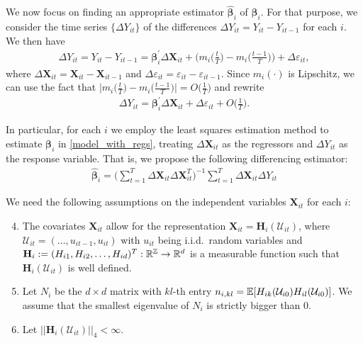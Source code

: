 \documentclass[a4paper,12pt]{article}
\begin{document}
We now focus on finding an appropriate estimator $\widehat{\bm{\beta}}_i$ of $\bm{\beta}_i$. For that purpose, we consider the time series $\{\Delta Y_{it}\}$ of the differences $\Delta Y_{it} = Y_{it} - Y_{i t-1}$ for each $i$. We then have
\begin{align*}
	\Delta Y_{it} = Y_{it} - Y_{i t-1} =\bm{\beta}_i^\prime \Delta \mathbf{X}_{it} + \bigg(m_i \Big( \frac{t}{T} \Big) - m_i \Big(\frac{t-1}{T}\Big)\bigg) + \Delta \varepsilon_{it},
\end{align*}
where $\Delta  \mathbf{X}_{it} =  \mathbf{X}_{it} -  \mathbf{X}_{it-1}$ and $ \Delta \varepsilon_{it} = \varepsilon_{it} - \varepsilon_{i t-1}$. Since $m_i(\cdot)$ is Lipschitz, we can use the fact that $ \big|m_i \big( \frac{t}{T} \big) - m_i \big(\frac{t-1}{T}\big) \big| = O\big(\frac{1}{T}\big)$ and rewrite 
\begin{align}\label{model_with_regs}
	\Delta Y_{it} = \bm{\beta}_i^\prime \Delta \mathbf{X}_{it} + \Delta \varepsilon_{it} + O\Big(\frac{1}{T}\Big).
\end{align}

In particular, for each $i$ we employ the least squares estimation method to estimate $\bm{\beta}_i$ in \eqref{model_with_regs}, treating $\Delta \mathbf{X}_{it}$ as the regressors and $\Delta Y_{it}$ as the response variable. That is, we propose the following differencing estimator:
\begin{align}\label{dif-est}
\widehat{\bm{\beta}}_i = \Big( \sum_{t=1}^T \Delta \mathbf{X}_{it} \Delta \mathbf{X}_{it}^T \Big)^{-1} \sum_{t=1}^T \Delta \mathbf{X}_{it} \Delta Y_{it}
\end{align}

We need the following assumptions on the independent variables $ \mathbf{X}_{it}$ for each $i$:

\begin{enumerate}[label=(C\arabic*),leftmargin=1.05cm]
\setcounter{enumi}{3}

\item \label{C-reg1} The covariates $ \mathbf{X}_{it}$ allow for the representation $ \mathbf{X}_{it} = \mathbf{H}_i(\mathcal{U}_{it})$, where $\mathcal{U}_{it} =(\ldots,u_{it-1},u_{it})$ with $u_{it}$ being i.i.d.\ random variables and $\mathbf{H}_i := (H_{i1}, H_{i2}, \ldots, H_{id})^T: \mathbb{R}^{\mathbb{Z}} \rightarrow \mathbb{R}^d$ is a measurable function such that $\mathbf{H}_i(\mathcal{U}_{it})$ is well defined. 

\item \label{C-reg2} Let $N_i$ be the $d\times d$ matrix with $kl$-th entry $n_{i, kl}= \mathbb{E}[H_{ik}(\mathcal{U}_{i0})H_{il}(\mathcal{U}_{i0})]$. We assume that the smallest eigenvalue of $N_i$ is strictly bigger than $0$.

\item \label{C-reg3} Let $||\mathbf{H}_{i}(\mathcal{U}_{it})||_4 <\infty$.
\end{enumerate}
\end{document}
